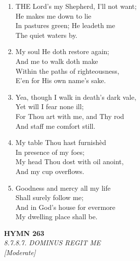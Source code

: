 \begin{enumerate}
    \item THE Lord's my Shepherd, I'll not want; \\
            He makes me down to lie \\
        In pastures green; He leadeth me \\
            The quiet waters by.

    \item My soul He doth restore again; \\
            And me to walk doth make \\
        Within the paths of righteousness, \\
            E'en for His own name's sake.

    \item Yea, though I walk in death's dark vale, \\
            Yet will I fear none ill; \\
        For Thou art with me, and Thy rod \\
            And staff me comfort still.

    \item My table Thou hast furnish\`ed \\
            In presence of my foes; \\
        My head Thou dost with oil anoint, \\
            And my cup overflows.

    \item Goodness and mercy all my life \\
            Shall surely follow me; \\
        And in God's house for evermore \\
            My dwelling place shall be.

\end{enumerate}

\newpage
\begin{center}
    {\Large \textbf{HYMN 263}}
    \\
    \textit{8.7.8.7. DOMINUS REGIT ME}
    \\
    \textit{\small [Moderate]}
\end{center}
\vspace{1em}

